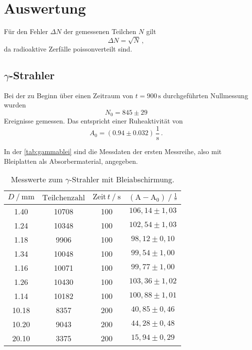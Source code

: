 \section{Auswertung}
\label{sec:Auswertung}
Für den Fehler $\Delta N$ der gemessenen Teilchen $N$ gilt
\begin{equation*}
    \Delta N = \sqrt{N} \,,
\end{equation*}
da radioaktive Zerfälle poissonverteilt sind.

\subsection*{$\gamma$-Strahler}

Bei der zu Beginn über einen Zeitraum von $t = 900 \,\unit{\second}$ durchgeführten Nullmessung wurden
\begin{equation*}
    N_0  = 845 \pm 29
\end{equation*}
Ereignisse gemessen.
Das entspricht einer Ruheaktivität von
\begin{equation*}
    A_0 = (0.94 \pm 0.032) \,\dfrac{1}{\unit{\second}} \, .
\end{equation*}

In der \autoref{tab:gammablei} sind die Messdaten der ersten Messreihe, also mit Bleiplatten als Absorbermaterial, angegeben.
\begin{table}[H]
    \centering
    \caption{Messwerte zum $\gamma$-Strahler mit Bleiabschirmung.}
    \label{tab:gammablei}
    \begin{tabular}{S[table-format=2.2] S[table-format=5.0] S[table-format=3.0] S}
      \toprule
      {$D \mathbin{/} \unit{\milli\meter} $} & {$\text{Teilchenzahl}$} & {$\text{Zeit} \,t \mathbin{/} \unit{\second}$} &{$ \left(\text{A}- \text{A}_0 \right) \mathbin{/} \unit{\frac{1}{\second}}$} \\
         & 10708  & 100 & {$106,14   \pm 1,03$}  \\
       1.24  & 10348  & 100 & {$102,54   \pm 1,03$}  \\
       1.18  &  9906  & 100 & {$ 98,12   \pm 0,10$}  \\
       1.34  & 10048  & 100 & {$ 99,54   \pm 1,00$}  \\
       1.16  & 10071  & 100 & {$ 99,77   \pm 1,00$}  \\
       1.26  & 10430  & 100 & {$103,36   \pm 1,02$}  \\
       1.14  & 10182  & 100 & {$100,88   \pm 1,01$}  \\
      10.18  &  8357  & 200 & {$ 40,85   \pm 0,46$}  \\
      10.20  &  9043  & 200 & {$ 44,28   \pm 0,48$}  \\
      20.10  &  3375  & 200 & {$ 15,94   \pm 0,29$}  \\
      \bottomrule
    \end{tabular}
  \end{table}

